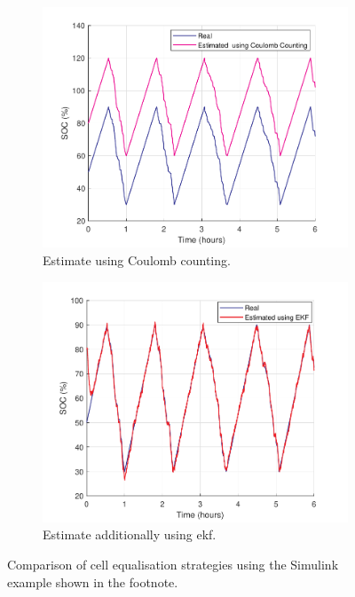 \begin{figure}[H]
    \centering
    \begin{subfigure}[b]{0.49\textwidth} %
        \centering
        \includegraphics[width=\textwidth]{figs/Samuel/Figures/plotsbattest (1) (cropped) (pdfresizer.com).pdf}
        \caption{Estimate using Coulomb counting.}
        \label{fig:coolomb}
    \end{subfigure}
    \hspace{0\textwidth}
    \begin{subfigure}[b]{0.49\textwidth} %
        \centering
        \includegraphics[width=\textwidth]{figs/Samuel/Figures/plotsbattest (1) (cropped) (pdfresizer.com) (1).pdf}
        \caption{Estimate additionally using \gls{ekf}.}
        \label{fig:kalmeff}
    \end{subfigure}
    \caption{Comparison of cell equalisation strategies using the Simulink example shown in the footnote.}
    \label{fig:bmsestimefk}
\end{figure}

